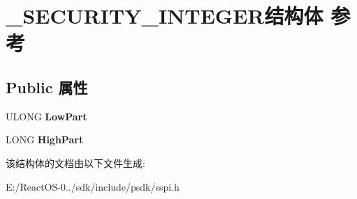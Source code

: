 \hypertarget{struct___s_e_c_u_r_i_t_y___i_n_t_e_g_e_r}{}\section{\+\_\+\+S\+E\+C\+U\+R\+I\+T\+Y\+\_\+\+I\+N\+T\+E\+G\+E\+R结构体 参考}
\label{struct___s_e_c_u_r_i_t_y___i_n_t_e_g_e_r}
\subsection*{Public 属性}
\begin{DoxyCompactItemize}
\item 
\mbox{\label{struct___s_e_c_u_r_i_t_y___i_n_t_e_g_e_r_a60663fab6d7c24dc9ac6dde26cc5cced}} 
U\+L\+O\+NG {\bfseries Low\+Part}
\item 
\mbox{\label{struct___s_e_c_u_r_i_t_y___i_n_t_e_g_e_r_ab30f214d721e516fad153f24e327d3e5}} 
L\+O\+NG {\bfseries High\+Part}
\end{DoxyCompactItemize}


该结构体的文档由以下文件生成\+:\begin{DoxyCompactItemize}
\item 
E\+:/\+React\+O\+S-\/0../sdk/include/psdk/sspi.\+h\end{DoxyCompactItemize}
